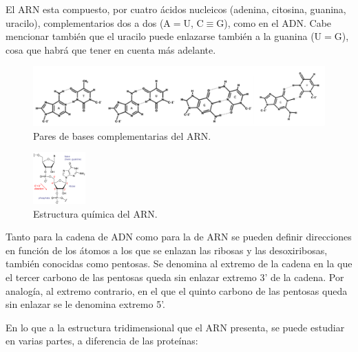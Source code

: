 \documentclass[a4paper,11pt,titlepage]{article}
\theoremstyle{definition}
\begin{document}
El ARN esta compuesto, por cuatro ácidos nucleicos (adenina, citosina, guanina, uracilo), complementarios dos a dos (A$=$U, C$\equiv$G), como en el ADN. Cabe mencionar también que el uracilo puede enlazarse también a la guanina (U$=$G), cosa que habrá que tener en cuenta más adelante.

\begin{figure}[H]
    \centering
    \includegraphics[width=\textwidth]{images/RNA_base_pairs.png}
    \caption{Pares de bases complementarias del ARN.}
    \label{fig:RNA_base_pairs}
\end{figure}


\begin{figure}
    \begin{center}
      \includegraphics[width=0.18\textwidth]{images/RNA_chemical_structure.png}
    \end{center}
    \caption{Estructura química del ARN.}
    \label{fig:arnchain}
\end{figure}

Tanto para la cadena de ADN como para la de ARN se pueden definir direcciones en función de los átomos a los que se enlazan las ribosas y las desoxiribosas, también conocidas como pentosas. Se denomina al extremo de la cadena en la que el tercer carbono de las pentosas queda sin enlazar extremo 3' de la cadena. Por analogía, al extremo contrario, en el que el quinto carbono de las pentosas queda sin enlazar se le denomina extremo 5'.

En lo que a la estructura tridimensional que el ARN presenta, se puede estudiar en varias partes, a diferencia de las proteínas:
\end{document}
